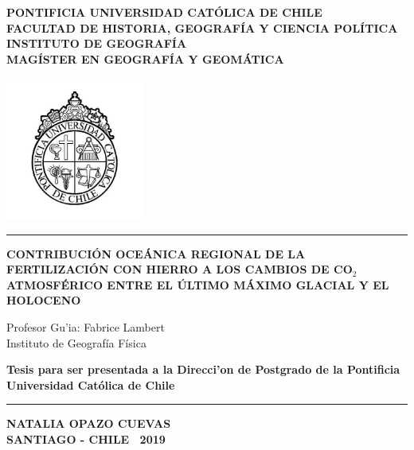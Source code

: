 \documentclass[letterpaper,11pt]{book} %
\begin{document}
\begin{titlepage}
 \begin{center}
\textbf{PONTIFICIA UNIVERSIDAD CAT\'OLICA DE CHILE} \\ 
\textbf{FACULTAD DE HISTORIA, GEOGRAF\'IA Y CIENCIA POL\'ITICA } \\
\textbf{INSTITUTO DE GEOGRAF\'IA} \\
\textbf{MAG\'ISTER EN GEOGRAF\'IA Y GEOM\'ATICA}

\includegraphics[height=4.7cm]{puc_logo.jpg}

\vspace{0.5cm} %

\rule{15cm}{0.1cm}

\vspace{1cm}

{\LARGE{\bf{CONTRIBUCI\'ON OCE\'ANICA REGIONAL DE LA FERTILIZACI\'ON CON HIERRO A LOS CAMBIOS DE CO$_{2}$ ATMOSF\'ERICO ENTRE EL ÚLTIMO MÁXIMO GLACIAL Y EL HOLOCENO }}}

\vspace{1cm}

{\large Profesor Gu'ia: Fabrice Lambert \\ 
Instituto de Geograf\'ia F\'isica \\ }
 
 \vspace{1cm}
 
 {\Large \bf Tesis para ser presentada a la Direcci'on de Postgrado de la Pontificia Universidad Cat\'olica de Chile}

 
\vspace{1cm}
% 
\rule{15cm}{0.1cm}

\vspace{0.5cm}

\textbf{NATALIA OPAZO CUEVAS \\ SANTIAGO -  CHILE \  2019}
\bigskip

\end{center}

\newpage


\end{titlepage}
\end{document}
